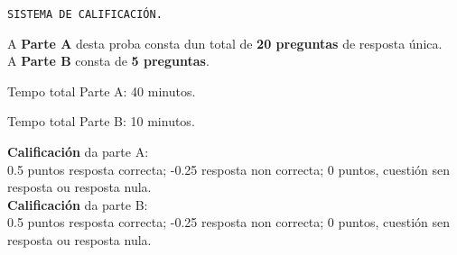 \begin{instruccions}
    \begin{center}
    \texttt{SISTEMA DE CALIFICACIÓN.}
    \end{center}
    \par
    \vspace*{0.15cm}
    A \textbf{Parte A} desta proba consta dun total de \textbf{20 preguntas} de resposta única.\\
    A \textbf{Parte B} consta de \textbf{5 preguntas}.
    \par
    \vspace*{0.15cm}
    Tempo total Parte A: 40 minutos.
    \par
    Tempo total Parte B: 10 minutos.
    \par
    \vspace*{0.15cm}
    \textbf{Calificación} da parte A: \\
    0.5 puntos resposta correcta; -0.25 resposta non correcta; 0 puntos, cuestión sen resposta ou resposta nula.\\
     \textbf{Calificación} da parte B:\\
     0.5 puntos resposta correcta; -0.25 resposta non correcta; 0 puntos, cuestión sen resposta ou resposta nula.
   
\end{instruccions}
%
\newpage
%
